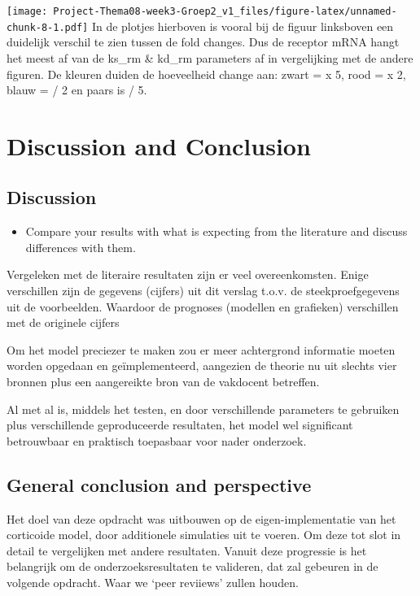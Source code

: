 \documentclass[
]{article}
\providecommand{\tightlist}{%
  \setlength{\itemsep}{0pt}\setlength{\parskip}{0pt}}
\begin{document}
\texttt{[image: Project-Thema08-week3-Groep2\_v1\_files/figure-latex/unnamed-chunk-8-1.pdf]}
In de plotjes hierboven is vooral bij de figuur linksboven een duidelijk
verschil te zien tussen de fold changes. Dus de receptor mRNA hangt het
meest af van de ks\_rm \& kd\_rm parameters af in vergelijking met de
andere figuren. De kleuren duiden de hoeveelheid change aan: zwart = x
5, rood = x 2, blauw = / 2 en paars is / 5.

\hypertarget{discussion-and-conclusion}{%
\section{Discussion and Conclusion}\label{discussion-and-conclusion}}

\hypertarget{discussion}{%
\subsection{Discussion}\label{discussion}}

\begin{itemize}
\tightlist
\item
  Compare your results with what is expecting from the literature and
  discuss differences with them.
\end{itemize}

Vergeleken met de literaire resultaten zijn er veel overeenkomsten.
Enige verschillen zijn de gegevens (cijfers) uit dit verslag t.o.v. de
steekproefgegevens uit de voorbeelden. Waardoor de prognoses (modellen
en grafieken) verschillen met de originele cijfers

Om het model preciezer te maken zou er meer achtergrond informatie
moeten worden opgedaan en geïmplementeerd, aangezien de theorie nu uit
slechts vier bronnen plus een aangereikte bron van de vakdocent
betreffen.

Al met al is, middels het testen, en door verschillende parameters te
gebruiken plus verschillende geproduceerde resultaten, het model wel
significant betrouwbaar en praktisch toepasbaar voor nader onderzoek.

\hypertarget{general-conclusion-and-perspective}{%
\subsection{General conclusion and
perspective}\label{general-conclusion-and-perspective}}

Het doel van deze opdracht was uitbouwen op de eigen-implementatie van
het corticoide model, door additionele simulaties uit te voeren. Om deze
tot slot in detail te vergelijken met andere resultaten. Vanuit deze
progressie is het belangrijk om de onderzoeksresultaten te valideren,
dat zal gebeuren in de volgende opdracht. Waar we `peer reviiews' zullen
houden.
\end{document}
